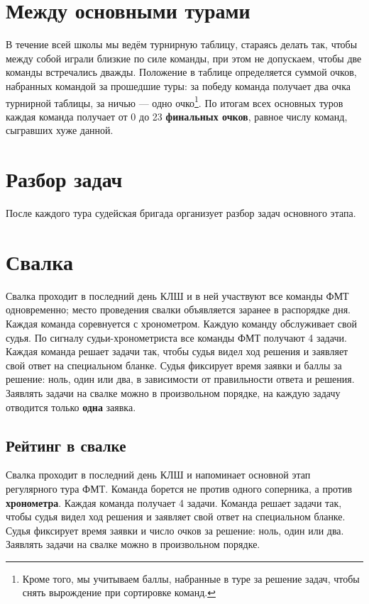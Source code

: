 \documentclass[12pt,a4paper]{article}
\begin{document}
\section{Между основными турами}
В течение всей школы мы ведём турнирную таблицу, стараясь делать так, чтобы между собой играли близкие по силе команды, при этом не допускаем, чтобы две команды встречались дважды. Положение в таблице определяется суммой очков, набранных командой за прошедшие туры: за победу команда получает два очка турнирной таблицы, за ничью --- одно очко\footnote{Кроме того, мы учитываем баллы, набранные в туре за решение задач, чтобы снять вырождение при сортировке команд.}. По итогам всех основных туров каждая команда получает от 0 до 23 {\bf финальных очков}, равное числу команд, сыгравших хуже данной.

\section{Разбор задач}
После каждого тура судейская бригада организует разбор задач основного этапа.

\section{Свалка}
Свалка проходит в последний день КЛШ и в ней участвуют все команды ФМТ одновременно; место проведения свалки объявляется заранее в распорядке дня. Каждая команда соревнуется с хронометром. Каждую команду обслуживает свой судья. По сигналу судьи-хронометриста все команды ФМТ получают 4 задачи. Каждая команда решает задачи так, чтобы судья видел ход решения и заявляет свой ответ на специальном бланке. Судья фиксирует время заявки и баллы за решение: ноль, один или два, в зависимости от правильности ответа и решения. Заявлять задачи на свалке можно в произвольном порядке, на каждую задачу отводится только \textbf{одна} заявка.

\subsection{Рейтинг в свалке}
Свалка проходит в последний день КЛШ и напоминает основной этап регулярного тура ФМТ. Команда борется не против одного соперника, а против {\bf хронометра}. Каждая команда получает 4 задачи. Команда решает задачи так, чтобы судья видел ход решения и заявляет свой ответ на специальном бланке. Судья фиксирует время заявки и число очков за решение: ноль, один или два. Заявлять задачи на свалке можно в произвольном порядке.
\end{document}
